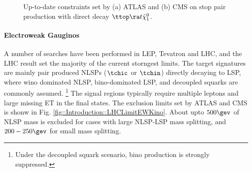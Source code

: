 \begin{figure}[h]
  \centering
    \caption{Up-to-date constraints set by (a) ATLAS and (b) CMS on stop pair production with direct decay $\ttop \ra t \tilde{\chi}_1^0$.}
    \label{fig::Introduction::LHCLimitStop}
\end{figure}



\paragraph{Electroweak Gauginos}
A number of searches have been performed in LEP, Tevatron and LHC, and the LHC result set the majority of the current storngest limits. The target signatures are mainly pair produced NLSPs ($\tchic$ or $\tchin$) directly decaying to LSP, where wino dominated NLSP, bino-dominated LSP, and decoupled squarks are commonly assumed.
\footnote{Under the decoupled squark scenario, bino production is strongly suppressed.}
The signal regions typically require multiple leptons and large missing ET in the final states.
The exclusion limits set by ATLAS and CMS is shonw in Fig. \ref{fig::Introduction::LHCLimitEWKino}.
About upto $500\gev$ of NLSP mass is excluded for cases with large NLSP-LSP mass splitting, and $200-250\gev$ for small mass splitting.  \\


